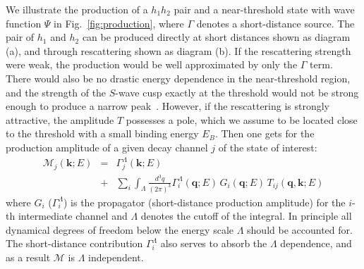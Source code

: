 We illustrate the production of a $h_1h_2$ pair and a near-threshold state
with wave function
$\Psi$ in Fig.~\ref{fig:production}, where $\Gamma$ denotes a short-distance
source. The pair of $h_1$ and $h_2$ can be produced directly at short
distances shown as diagram (a), and through rescattering shown as diagram (b).
If the rescattering strength were weak, the production would be well approximated by only the
$\Gamma$ term. There would also be no drastic energy dependence in the
near-threshold region, and the strength of the $S$-wave cusp exactly at the
threshold would not be strong enough to produce a narrow
peak~\cite{Guo:2014iya}.
However, if the rescattering is strongly attractive, the amplitude $T$
possesses a pole, which we assume to be located close to the threshold with a small binding
energy
$E_B$. Then one gets for  the production amplitude of a given decay channel $j$ of
the state of interest:
\begin{eqnarray}
    \mathcal{M}_j(\bm k; E) &=&  \Gamma_j^\Lambda(\bm k;E)  \\
    &+&    \sum_i \int_\Lambda\! \frac{d^3q}{(2\pi)^3}
\Gamma_i^\Lambda(\bm{q};E)\, G_i(\bm q;E)\,   T_{ij}(\bm q, \bm k; E)
    \nonumber
    \label{eq:Aproduction_pair}
\end{eqnarray}
where $G_i$ ($\Gamma_i^\Lambda$) is the propagator (short-distance production
amplitude) for the $i$-th intermediate channel and $\Lambda$ denotes the cutoff of
the integral. In principle all dynamical degrees of freedom below the energy
scale $\Lambda$ should be accounted for. The short-distance contribution
$\Gamma_i^\Lambda$ also serves to absorb the $\Lambda$ dependence, and as a
result $\mathcal{M}$ is $\Lambda$ independent.

